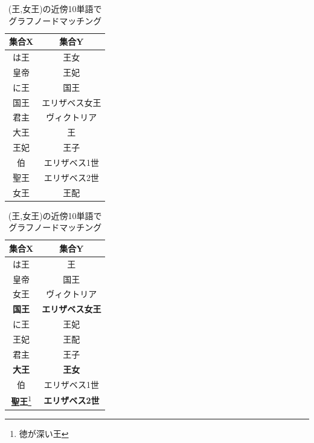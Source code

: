 \begin{table}[!h]
  \begin{minipage}[t]{.45\textwidth}
    \caption[(王,女王)の近傍10単語]{(王,女王)の近傍10単語}
    \label{}
    \begin{center}
      \begin{tabular}{|c||c|} \hline
        集合X & 集合Y \\ \hline \hline
        は王 & 王女 \\
        皇帝 & 王妃 \\
        に王 & 国王 \\
        国王 & エリザベス女王 \\
        君主 & ヴィクトリア \\
        大王 & 王 \\
        王妃 & 王子 \\
        伯 & エリザベス1世 \\
        聖王 & エリザベス2世 \\
        女王 & 王配 \\ \hline
      \end{tabular}
    \end{center}
  \end{minipage}
  \hfill
  \begin{minipage}[t]{.45\textwidth}
    \caption[(王,女王)の近傍10単語でグラフノードマッチング]{(王,女王)の近傍10単語でグラフノードマッチング}
    \label{}
    \begin{center}
      \begin{tabular}{|c||c|} \hline
        集合X & 集合Y \\ \hline \hline
        は王 & 王 \\
        皇帝 & 国王 \\
        女王 & ヴィクトリア \\
        \textbf{国王} & \textbf{エリザベス女王} \\
        に王 & 王妃 \\
        王妃 & 王配 \\
        君主 & 王子 \\
        \textbf{大王} & \textbf{王女} \\
        伯 & エリザベス1世 \\
        \textbf{聖王}\footnote{徳が深い王} & \textbf{エリザベス2世} \\ \hline
      \end{tabular}
    \end{center}
  \end{minipage}
\end{table}

